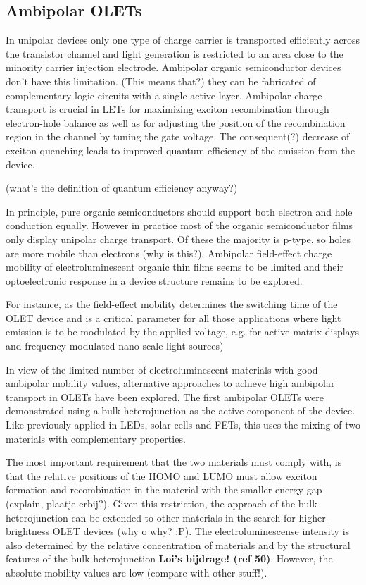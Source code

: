 \subsection{Ambipolar OLETs} %
In unipolar devices only one type of charge carrier is transported efficiently across the transistor channel and light generation is restricted to an area close to the minority carrier injection electrode. Ambipolar organic semiconductor devices don't have this limitation. (This means that?) they can be fabricated of complementary logic circuits with a single active layer. Ambipolar charge transport is crucial in LETs for maximizing exciton recombination through electron-hole balance as well as for adjusting the position of the recombination region in the channel by tuning the gate voltage. The consequent(?) decrease of exciton quenching leads to improved quantum efficiency of the emission from the device.

(what's the definition of quantum efficiency anyway?)

In principle, pure organic semiconductors should support both electron and hole conduction equally. However in practice most of the organic semiconductor films only display unipolar charge transport. Of these the majority is p-type, so holes are more mobile than electrons (why is this?). Ambipolar field-effect charge mobility of electroluminescent organic thin films seems to be limited and their optoelectronic response in a device structure remains to be explored. 

For instance, as the field-effect mobility determines the switching time of the OLET device and is a critical parameter for all those applications where light emission is to be modulated by the applied voltage, e.g. for active matrix displays and frequency-modulated nano-scale light sources)

In view of the limited number of electroluminescent materials with good ambipolar mobility values, alternative approaches to achieve high ambipolar transport in OLETs have been explored. The first ambipolar OLETs were demonstrated using a bulk heterojunction as the active component of the device. Like previously applied in LEDs, solar cells and FETs, this uses the mixing of two materials with complementary properties.

The most important requirement that the two materials must comply with, is that the relative positions of the HOMO and LUMO must allow exciton formation and recombination in the material with the smaller energy gap (explain, plaatje erbij?). Given this restriction, the approach of the bulk heterojunction can be extended to other materials in the search for higher-brightness OLET devices (why o why? :P). The electroluminescense intensity is also determined by the relative concentration of materials and by the structural features of the bulk heterojunction \textbf{Loi’s bijdrage! (ref 50)}. However, the absolute mobility values are low (compare with other stuff!).

